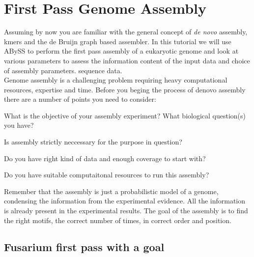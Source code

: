 
\newpage

\section{First Pass Genome Assembly}
\begin{information}
Assuming by now you are familiar with the general concept of \textit{de novo} assembly, kmers and the de Bruijn graph based assembler. In this tutorial we will use ABySS to perform  the first pass assembly of a eukaryotic genome and look at various parameters to assess the information content of the input data and choice of assembly parameters. 
sequence data.\\ 
Genome assembly is a challenging problem requiring heavy computational resources, expertise and time. Before you beging the process of denovo assembly there are a number of points you need to consider:
\item What is the objective of your assembly experiment? What biological question(s) you have?
\item Is assembly strictly neccessary for the purpose in question?
\item Do you have right kind of data and enough coverage to start with?
\item Do you have suitable computaitonal resources to run this assembly?

\end{information}

\begin{note}
Remember that the assembly is just a probabilistic model of a genome, condensing the information 
from the experimental evidence.  All the information is already present in the 
experimental results. The goal of the assembly is to find the right motifs, 
the correct number of times, in correct order and position.
\end{note}


\subsection{Fusarium first pass with a goal}

